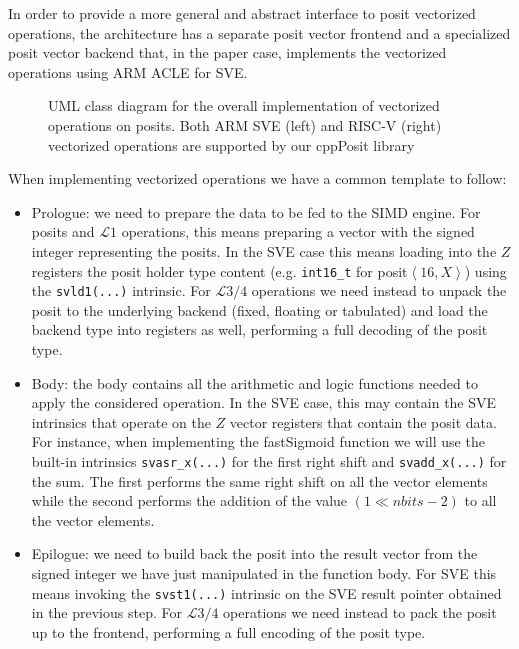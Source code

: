 In order to provide a more general and abstract interface to posit vectorized operations, the architecture has a separate posit vector frontend and a specialized posit vector backend that, in the paper case, implements the vectorized operations using ARM ACLE for SVE.
\begin{figure}
\centering
{}
\caption{UML class diagram for the overall implementation of vectorized operations on posits. Both ARM SVE (left) and RISC-V (right) vectorized operations are supported by our cppPosit library}
\label{fig:cppPositvect}
\end{figure}
When implementing vectorized operations we have a common template to follow: 
\begin{itemize}
    \item Prologue: we need to prepare the data to be fed to the SIMD engine. For posits and $\mathcal{L}1$ operations, this means preparing a vector with the signed integer representing the posits. In the SVE case this means loading into the $Z$ registers the posit holder type content (e.g. \texttt{int16\_t} for posit$\left<16,X\right>$) using the \texttt{svld1(...)} intrinsic. For $\mathcal{L}3/4$ operations we need instead to unpack the posit to the underlying backend (fixed, floating or tabulated) and load the backend type into registers as well, performing a full decoding of the posit type.
    \item Body: the body contains all the arithmetic and logic functions needed to apply the considered operation. In the SVE case, this may contain the SVE intrinsics that operate on the $Z$ vector registers that contain the posit data. For instance, when implementing the fastSigmoid function we will use the built-in intrinsics \texttt{svasr\_x(...)} for the first right shift and \texttt{sv\-add\_x(...)} for the sum. The first performs the same right shift on all the vector elements while the second performs the addition of the value $(1\ll nbits-2)$ to all the vector elements.
    \item Epilogue: we need to build back the posit into the result vector from the signed integer we have just manipulated in the function body. For SVE this means invoking the \texttt{svst1(...)} intrinsic on the SVE result pointer obtained in the previous step. For $\mathcal{L}3/4$ operations we need instead to pack the posit up to the frontend, performing a full encoding of the posit type.
\end{itemize}

